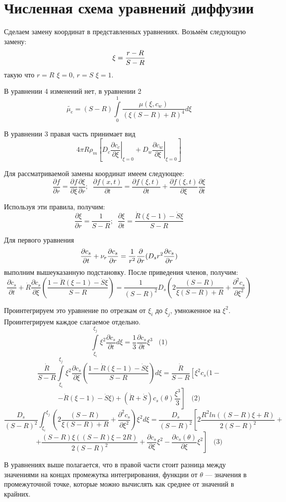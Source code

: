 \section{Численная схема уравнений диффузии}

\par Сделаем замену координат в представленных уравнениях. Возьмём следующую замену: $$\displaystyle \xi = \frac{r-R}{S-R}$$
такую что $r = R$ $\xi = 0$, $r = S$ $\xi = 1$.
\par В уравнении 4 изменений нет, в уравнении 2 $$\tilde{\mu_{e}}=(S-R)\int\limits^{1}_{0}\frac{\mu(\xi, c_{w})}{(\xi(S-R)+R)^{4}}d\xi$$
\par В уравнении 3 правая часть принимает вид $$4\pi R\rho_{m}\left[D_{c}\left.\frac{\partial c_{c}}{\partial \xi}\right|_{\xi=0}+D_{w}\left.\frac{\partial c_{w}}{\partial \xi}\right|_{\xi=0}\right]$$
\par Для рассматриваемой замены координат имеем следующее:
$$\frac{\partial f}{\partial r}=\frac{\partial f}{\partial \xi}\frac{\partial \xi}{\partial r};\;\;\frac{\partial f(x,t)}{\partial t}=\frac{\partial f(\xi,t)}{\partial t}+\frac{\partial f(\xi,t)}{\partial \xi}\frac{\partial \xi}{\partial t}$$
\par Используя эти правила, получим:
$$\frac{\partial \xi}{\partial r}=\frac{1}{S-R};\;\;\frac{\partial \xi}{\partial t}=\frac{\dot{R}(\xi -1)-\dot{S}\xi}{S-R}$$

\par Для первого уравнения $$\displaystyle \frac{\partial c_{s}}{\partial t}+\nu_{r} \frac{\partial c_{s}}{\partial r}=\frac{1}{r^{2}}\frac{\partial}{\partial r}(D_{s}r^{2}\frac{\partial c_{s}}{\partial r})$$
выполним вышеуказанную подстановку. После приведения членов, получим:
$$\frac{\partial c_{s}}{\partial t}+\dot{R}\frac{\partial c_{s}}{\partial \xi}\left(\frac{1-\dot{R}(\xi -1)-\dot{S}\xi}{S-R}\right)=\frac{1}{(S-R)^{2}}D_{s}\left(2\frac{(S-R)}{\xi(S-R)+R}+\frac{\partial^{2} c_{s}}{\partial \xi^{2}}\right)$$
\par Проинтегрируем это уравнение по отрезкам от $\xi_{i}$ до $\xi_{j}$, умноженное на $\xi^{2}$. Проинтегрируем каждое слагаемое отдельно.
$$\int\limits^{\xi_{j}}_{\xi_{i}}\xi^{2}\frac{\partial c_{s}}{\partial t}d\xi=\frac{1}{3}\frac{\partial c_{s}}{\partial t}\xi^{3}\;\;\;\text{(1)}$$
$$\frac{\dot{R}}{S-R}\int\limits^{\xi_{j}}_{\xi_{i}}\xi^{2}\frac{\partial c_{s}}{\partial \xi}\left(\frac{1-\dot{R}(\xi-1)-\dot{S}\xi}{S-R}\right)d\xi=\frac{\dot{R}}{S-R}\left[\xi^{2}c_{s}(1-\right.$$
$$\left.-\dot{R}(\xi-1)-\dot{S}\xi)+(\dot{R}+\dot{S})c_{s}(\theta)\frac{\xi^{3}}{3}\right]\;\;\;\text{(2)}$$
$$\frac{D_{s}}{(S-R)^{2}}\int^{\xi_{j}}_{\xi_{i}}\left(2\frac{(S-R)}{\xi(S-R)+R}+\frac{\partial^{2} c_{s}}{\partial \xi^{2}}\right)\xi^{2}d\xi=\frac{D_{s}}{(S-R)^{2}}\left[2\frac{R^{2}ln\left((S-R)\xi+R\right)}{2(S-R)^{2}}+\right.$$
$$+\left.\frac{(S-R)\xi((S-R)\xi-2R)}{2(S-R)^{2}}+\frac{\partial c_{s}}{\partial \xi}\xi^{2}-\frac{\partial c_{s}(\theta)}{\partial \xi}\xi^{2}\right]\;\;\;\text{(3)}$$
\par В уравнениях выше полагается, что в правой части стоит разница между значениями на концах промежутка интегрирования, функции от $\theta$ --- значения в промежуточной точке, которые можно вычислять как среднее от значений в крайних.
